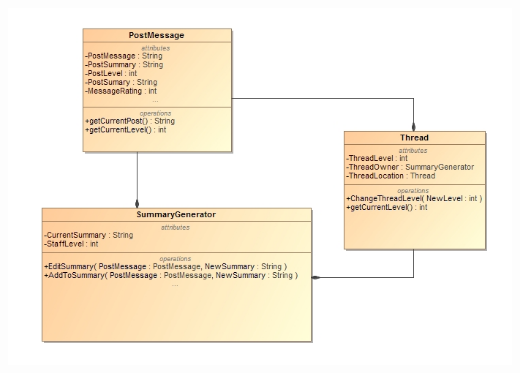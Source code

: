 \documentclass[11pt]{article}
\begin{document}
\begin{enumerate}
\begin{center}
			 	  			\includegraphics[scale=0.5]{Diagrams/B3 ClassDiagram.png}
			 	  		\end{center}
	

\end{enumerate}
\end{document}
